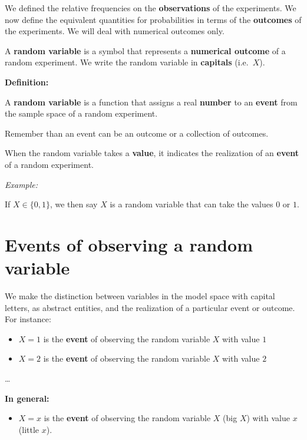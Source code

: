 \documentclass[
]{book}
\providecommand{\tightlist}{%
  \setlength{\itemsep}{0pt}\setlength{\parskip}{0pt}}
\begin{document}
We defined the relative frequencies on the \textbf{observations} of the experiments. We now define the equivalent quantities for probabilities in terms of the \textbf{outcomes} of the experiments. We will deal with numerical outcomes only.

A \textbf{random variable} is a symbol that represents a \textbf{numerical outcome} of a random experiment. We write the random variable in \textbf{capitals} (i.e.~\(X\)).

\textbf{Definition:}

A \textbf{random variable} is a function that assigns a real \textbf{number} to an \textbf{event} from the sample space of a random experiment.

Remember than an event can be an outcome or a collection of outcomes.

When the random variable takes a \textbf{value}, it indicates the realization of an \textbf{event} of a random experiment.

\emph{Example:}

If \(X \in \{0,1\}\), we then say \(X\) is a random variable that can take the values \(0\) or \(1\).

\hypertarget{events-of-observing-a-random-variable}{%
\section{Events of observing a random variable}\label{events-of-observing-a-random-variable}}

We make the distinction between variables in the model space with capital letters, as abstract entities, and the realization of a particular event or outcome. For instance:

\begin{itemize}
\tightlist
\item
  \(X=1\) is the \textbf{event} of observing the random variable \(X\) with value \(1\)
\item
  \(X=2\) is the \textbf{event} of observing the random variable \(X\) with value \(2\)
\end{itemize}

\ldots{}

\textbf{In general:}

\begin{itemize}
\tightlist
\item
  \(X=x\) is the \textbf{event} of observing the random variable \(X\) (big \(X\)) with value \(x\) (little \(x\)).
\end{itemize}
\end{document}
